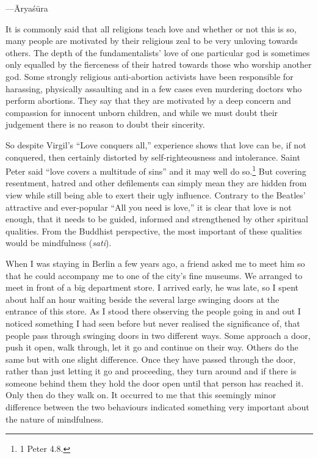 \documentclass[10pt, openright]{book}
\newenvironment{epigram-2-cite}%
{%
\quoting[leftmargin=2.5cm,rightmargin=2.5cm]%
\noindent\normal\hspace*{\fill} 
}%
{\endquoting\vspace{1em}
}%
\begin{document}
\begin{epigram-2-cite}
—Āryaśūra
\end{epigram-2-cite}

It is commonly said that all religions teach love and whether or not this is so, many people are motivated by their religious zeal to be very unloving towards others. The depth of the fundamentalists’ love of one particular god is sometimes only equalled by the fierceness of their hatred towards those who worship another god. Some strongly religious anti-abortion activists have been responsible for harassing, physically assaulting and in a few cases even murdering doctors who perform abortions. They say that they are motivated by a deep concern and compassion for innocent unborn children, and while we must doubt their judgement there is no reason to doubt their sincerity.


So despite Virgil’s “Love conquers all,” experience shows that love can be, if not conquered, then certainly distorted by self-righteousness and intolerance. Saint Peter said “love covers a multitude of sins” and it may well do so.\footnote {1 Peter 4.8.} But covering resentment, hatred and other defilements can simply mean they are hidden from view while still being able to exert their ugly influence. Contrary to the Beatles’ attractive and ever-popular “All you need is love,” it is clear that love is not enough, that it needs to be guided, informed and strengthened by other spiritual qualities. From the Buddhist perspective, the most important of these qualities would be mindfulness (\textit{sati}).


When I was staying in Berlin a few years ago, a friend asked me to meet him so that he could accompany me to one of the city’s fine museums. We arranged to meet in front of a big department store. I arrived early, he was late, so I spent about half an hour waiting beside the several large swinging doors at the entrance of this store. As I stood there observing the people going in and out I noticed something I had seen before but never realised the significance of, that people pass through swinging doors in two different ways. Some approach a door, push it open, walk through, let it go and continue on their way. Others do the same but with one slight difference. Once they have passed through the door, rather than just letting it go and proceeding, they turn around and if there is someone behind them they hold the door open until that person has reached it. Only then do they walk on. It occurred to me that this seemingly minor difference between the two behaviours indicated something very important about the nature of mindfulness.
\end{document}
